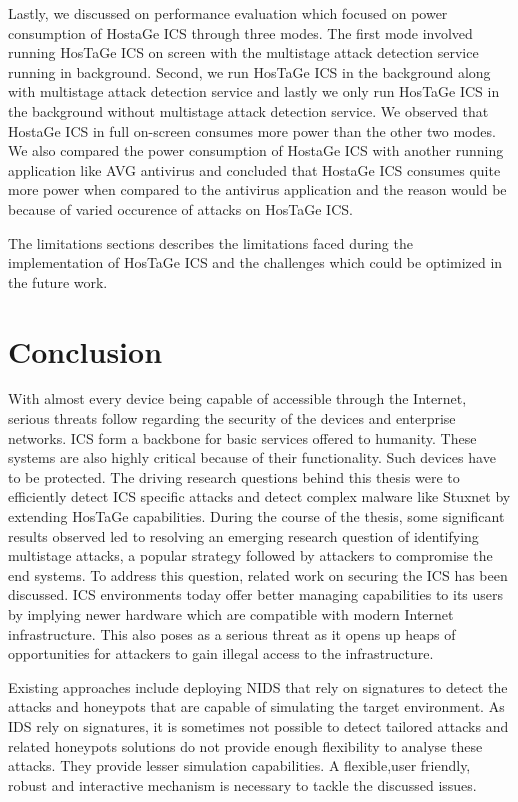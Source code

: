 \documentclass[article,msc=informatik,type=msc,colorback,accentcolor=tud9c]{tudthesis}
\begin{document}
	\vspace{3mm}
	Lastly, we discussed on performance evaluation which focused on power consumption of HostaGe ICS through three modes. The first mode involved running HosTaGe ICS on screen with the multistage attack detection service running in background. Second, we run HosTaGe ICS in the background along with multistage attack detection service and lastly we only run HosTaGe ICS in the background without multistage attack detection service.  We observed that HostaGe ICS in full on-screen consumes more power than the other two modes. We also compared the power consumption of HostaGe ICS with another running application like AVG antivirus and concluded that HostaGe ICS consumes quite more power when compared to the antivirus application and the reason would be because of varied occurence of attacks on HosTaGe ICS.
	
	The limitations sections describes the limitations faced during the implementation of HosTaGe ICS and the challenges which could be optimized in the future work. 

	\newpage
  	\section{Conclusion}\label{Conclusion}
	With almost every device being capable of accessible through the Internet, serious threats follow regarding the security of the devices and enterprise networks. \ac{ICS} form a backbone for basic services offered to humanity. These systems are also highly critical because of their functionality. Such devices have to be protected. The driving research questions behind this thesis were to efficiently detect \ac{ICS} specific attacks and detect complex malware like Stuxnet by extending HosTaGe capabilities. During the course of the thesis, some significant results observed led to resolving an emerging research question of identifying multistage attacks, a popular strategy followed by attackers to compromise the end systems. To address this question, related work on securing the \ac{ICS}
	has been discussed. \ac{ICS} environments today offer better managing capabilities to its users by implying newer hardware which are compatible with modern Internet infrastructure. This also poses as a serious threat as it opens up heaps of opportunities for attackers to gain illegal access to the infrastructure. 
	
	
	\vspace{3mm}
	Existing approaches include deploying \ac{NIDS} that rely on signatures to detect the attacks and honeypots that are capable of simulating the target environment. As \ac{IDS} rely on signatures, it is sometimes not possible to detect tailored attacks and related honeypots solutions do not provide enough flexibility to analyse these attacks. They provide lesser simulation capabilities. A flexible,user friendly, robust and interactive mechanism is necessary to tackle the discussed issues.
\end{document}
